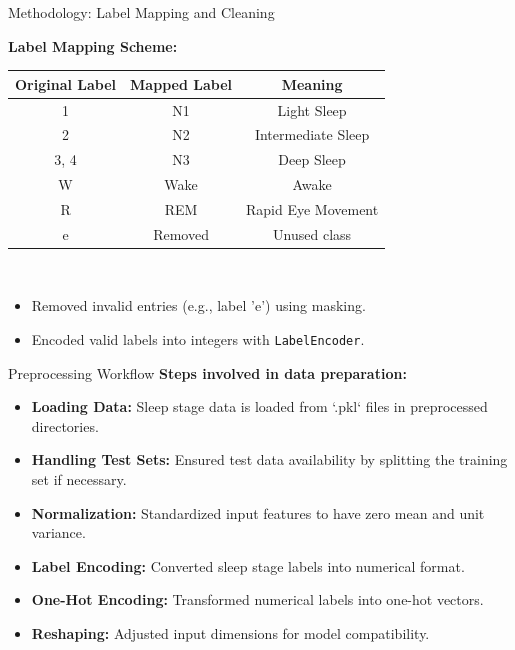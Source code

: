 \begin{frame}{Methodology: Label Mapping and Cleaning}
	
	\small
	\textbf{Label Mapping Scheme:} \\[5pt]
	\centering
	\begin{tabular}{|c|c|c|}
		\hline
		\textbf{Original Label} & \textbf{Mapped Label} & \textbf{Meaning} \\
		\hline
		1 & N1 & Light Sleep \\
		\hline
		2 & N2 & Intermediate Sleep \\
		\hline
		3, 4 & N3 & Deep Sleep \\
		\hline
		W & Wake & Awake \\
		\hline
		R & REM & Rapid Eye Movement \\
		\hline
		e & Removed & Unused class \\
		\hline
	\end{tabular} \\[8pt]
	
	
	
	
	\begin{itemize}
		\item Removed invalid entries (e.g., label 'e') using masking.
		\item Encoded valid labels into integers with \texttt{LabelEncoder}.
	\end{itemize}
	
	
	
\end{frame}
 
 






\begin{frame}{Preprocessing Workflow}
	\textbf{Steps involved in data preparation:} \\[10pt]
	\begin{itemize}
		\item \textbf{Loading Data:} Sleep stage data is loaded from `.pkl` files in preprocessed directories.
		\item \textbf{Handling Test Sets:} Ensured test data availability by splitting the training set if necessary.
		\item \textbf{Normalization:} Standardized input features to have zero mean and unit variance.
		\item \textbf{Label Encoding:} Converted sleep stage labels into numerical format.
		\item \textbf{One-Hot Encoding:} Transformed numerical labels into one-hot vectors.
		\item \textbf{Reshaping:} Adjusted input dimensions for model compatibility.
	\end{itemize}
\end{frame}


